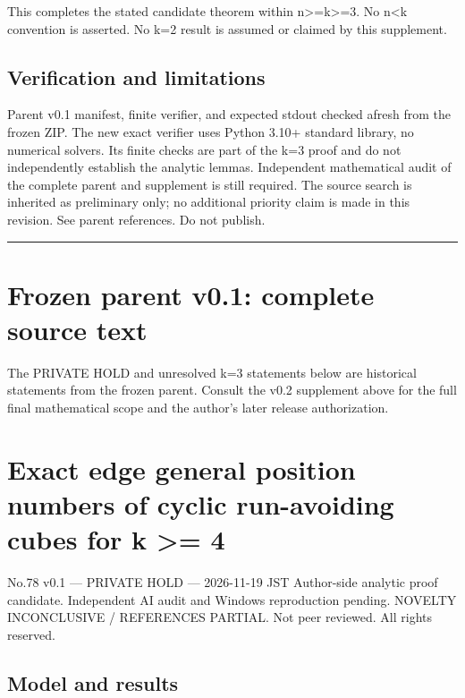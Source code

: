 \documentclass[
  10pt,
]{article}
\begin{document}
This completes the stated candidate theorem within
n\textgreater=k\textgreater=3. No n\textless k convention is asserted.
No k=2 result is assumed or claimed by this supplement.

\subsection{Verification and
limitations}\label{verification-and-limitations}

Parent v0.1 manifest, finite verifier, and expected stdout checked
afresh from the frozen ZIP. The new exact verifier uses Python 3.10+
standard library, no numerical solvers. Its finite checks are part of
the k=3 proof and do not independently establish the analytic lemmas.
Independent mathematical audit of the complete parent and supplement is
still required. The source search is inherited as preliminary only; no
additional priority claim is made in this revision. See parent
references. Do not publish.

\begin{center}\rule{0.5\linewidth}{0.5pt}\end{center}

\section{Frozen parent v0.1: complete source
text}\label{frozen-parent-v0.1-complete-source-text}

The PRIVATE HOLD and unresolved k=3 statements below are historical
statements from the frozen parent. Consult the v0.2 supplement above for
the full final mathematical scope and the author's later release
authorization.

\section{Exact edge general position numbers of cyclic run-avoiding
cubes for k \textgreater=
4}\label{exact-edge-general-position-numbers-of-cyclic-run-avoiding-cubes-for-k-4}

No.78 v0.1 --- PRIVATE HOLD --- 2026-11-19 JST Author-side analytic
proof candidate. Independent AI audit and Windows reproduction pending.
NOVELTY INCONCLUSIVE / REFERENCES PARTIAL. Not peer reviewed. All rights
reserved.

\subsection{Model and results}\label{model-and-results}
\end{document}
